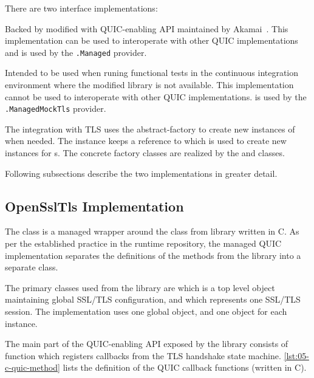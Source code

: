 There are two \ITls{} interface implementations:

\begin{itemize}

  \litem[]{\OpenSslTls{}} Backed by modified \libopenssl{} with QUIC-enabling API maintained by
Akamai~\cite{AkamaiOpensslGithub}. This implementation can be used to interoperate with other QUIC
implementations and is used by the \texttt{\QuicImplementationProviders{}\allowbreak{}.Managed}
provider.

  \litem[]{\MockTls{}} Intended to be used when runing functional tests in the continuous
integration environment where the modified \libopenssl{} library is not available. This
implementation cannot be used to interoperate with other QUIC implementations. \MockTls{} is used by
the \texttt{\QuicImplementationProviders{}\allowbreak{}.ManagedMockTls} provider.

\end{itemize}

The integration with TLS uses the \gls{abstract-factory} to create new instances of \ITls{} when
needed. The \ManagedQuicImplementationProvider{} instance keeps a reference to \QuicTlsProvider{}
which is used to create new \ITls{} instances for \ManagedQuicConnection{}s. The concrete factory
classes are realized by the \OpenSslQuicTlsProvider{} and \MockQuicTlsProvider{} classes.

Following subsections describe the two \ITls{} implementations in greater detail.

\subsection{OpenSslTls Implementation}

The \OpenSslTls{} class is a managed wrapper around the \SSL{} class from \libopenssl{} library
written in C. As per the established practice in the \dotnet{} runtime repository, the managed QUIC
implementation separates the definitions of the  methods from the \libopenssl{}
library into a separate  class.

The primary classes used from the \libopenssl{} library are \SSLCTX{} which is a top level object
maintaining global SSL/TLS configuration, and \SSL{} which represents one SSL/TLS session. The
\OpenSslTls{} implementation uses one global \SSLCTX{} object, and one \SSL{} object for each
\OpenSslTls{} instance.

The main part of the QUIC-enabling API exposed by the \libopenssl{} library consists of
 function which registers callbacks from the TLS handshake state
machine. \autoref{lst:05-c-quic-method} lists the definition of the \libopenssl{} QUIC callback
functions (written in C).

